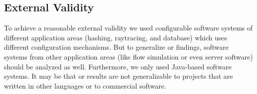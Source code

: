 \subsection{External Validity}

To achieve a reasonable external validity we used configurable software systems of different application areas (hashing, raytracing, and database) which uses different configuration mechanisms. But to generalize or findings, software systems from other application areas (like flow simulation or even server software) should be analyzed as well. Furthermore, we only used Java-based software systems. It may be that or results are not generalizable to projects that are written in other languages or to commercial software. 
